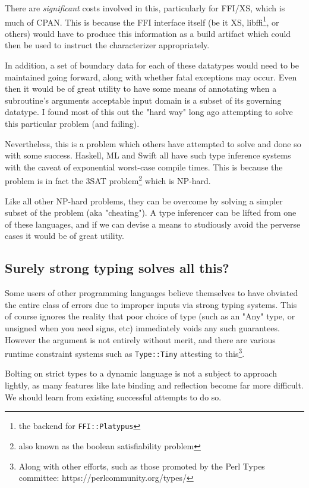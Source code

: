 \documentclass{article}
\begin{document}
There are \textit{significant} costs involved in this, particularly for FFI/XS, which is much of CPAN.
This is because the FFI interface itself (be it XS, libffi\footnote{the backend for \texttt{FFI::Platypus}}, or others) would have to produce this information as a build artifact
which could then be used to instruct the characterizer appropriately.

In addition, a set of boundary data for each of these datatypes would need to be maintained going forward, along with whether fatal exceptions may occur.
Even then it would be of great utility to have some means of annotating when a subroutine's arguments acceptable input domain is a subset of its governing datatype.
I found most of this out the "hard way" \cite{gsb} long ago attempting to solve this particular problem (and failing).

Nevertheless, this is a problem which others have attempted to solve and done so with some success.
Haskell, ML and Swift all have such type inference systems with the caveat of exponential worst-case compile times\cite{clippert}.
This is because the problem is in fact the 3SAT problem\footnote{also known as the boolean satisfiability problem} which is NP-hard\cite{mltype}.

Like all other NP-hard problems, they can be overcome by solving a simpler subset of the problem (aka "cheating").
A type inferencer can be lifted from one of these languages, and if we can devise a means to studiously avoid the perverse cases it would be of great utility.

\subsection{Surely strong typing solves all this?}

Some users of other programming languages believe themselves to have obviated the entire class of errors due to improper inputs via strong typing systems.
This of course ignores the reality that poor choice of type (such as an "Any" type, or unsigned when you need signs, etc) immediately voids any such guarantees.
However the argument is not entirely without merit, and there are various runtime constraint systems such as \texttt{Type::Tiny} attesting to this\footnote{Along with other efforts, such as those promoted by the Perl Types committee: https://perlcommunity.org/types/}.

Bolting on strict types to a dynamic language is not a subject to approach lightly, as many features like late binding and reflection become far more difficult.
We should learn from existing successful attempts to do so.
\end{document}
